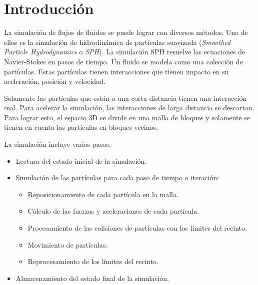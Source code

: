 \section{Introducción}

La simulación de flujos de fluidos se puede lograr con diversos métodos. Uno de
ellos es la simulación de hidrodinámica de partículas suavizada (\emph{Smoothed
Particle Hydrodynamics} o \emph{SPH}). La simulación SPH resuelve las ecuaciones
de Navier-Stokes en pasos de tiempo. Un fluido se modela como una colección de
partículas. Estas partículas tienen interacciones que tienen impacto en su
aceleración, posición y velocidad.

Solamente las partículas que están a una corta distancia tienen una interacción
real. Para acelerar la simulación, las interacciones de larga distancia se
descartan. Para lograr esto, el espacio 3D se divide en una malla de bloques y
solamente se tienen en cuenta las partículas en bloques vecinos.

La simulación incluye varios pasos:
\begin{itemize}
  \item Lectura del estado inicial de la simulación.
  \item Simulación de las partículas para cada paso de tiempo o iteración:
    \begin{itemize}
      \item Reposicionamiento de cada partícula en la malla.
      \item Cálculo de las fuerzas y aceleraciones de cada partícula.
      \item Procesamiento de las colisiones de partículas con los límites del
recinto.
      \item Movimiento de partículas.
      \item Reprocesamiento de los límites del recinto.
    \end{itemize}
  \item Almacenamiento del estado final de la simulación.
\end{itemize}
